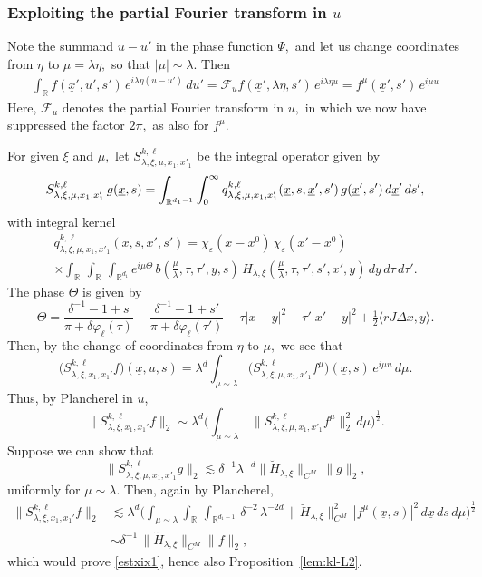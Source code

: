 \documentclass[leqno]{amsart}
\theoremstyle{definition}
\theoremstyle{remark}
\numberwithin{equation}{section}
\newcommand{\R}{\mathbb{R}}
\newcommand{\scriptF}{\mathcal{F}}
\newcommand\la{{\lambda}}
\begin{document}
\subsubsection{Exploiting the partial Fourier transform in $u$}

Note the summand $u-u'$ in the phase function $\Psi,$ and let us change coordinates from $\eta$  to $\mu = \lambda\eta,$ so that $|\mu|\sim\la$. Then 
\begin{align*}
\int_{\R}f(\underline x',u',s') \, e^{i \lambda \eta(u-u')} \, d u' 
 = \scriptF_u f(\underline x', \lambda \eta,s') \, e^{i \lambda \eta u} 
 = f^{\mu}(\underline x',s') \, e^{i \mu u}
\end{align*}
Here,  $\scriptF_u $ denotes the partial Fourier transform in $u,$ in which we now have suppressed the factor $2\pi,$ as also for $f^\mu$.

For given $\xi$ and $\mu,$ let $S_{\lambda,\xi,\mu,x_1,x'_1}^{k,\ell}$ be the integral operator given by
\[
S_{\lambda,\xi,\mu,x_1,x'_1}^{k,\ell} \, g(\underline x,s) \\
 = \int_{\R^{d_1-1}} \int_0^\infty q^{k,\ell}_{\lambda,\xi,\mu,x_1,x'_1}(\underline x,s,\underline x',s') \, g(\underline x',s') \, d\underline x' \, ds',
\]
with integral kernel
\begin{multline*}
q^{k,\ell}_{\lambda,\xi,\mu,x_1,x'_1}
(\underline x,s,\underline x',s')
=
\chi_\varepsilon(x-x^0)\,
\chi_\varepsilon(x'-x^0)\\
\times \int_\R\,\int_\R\,\int_{\R^{d_1}}
e^{i\mu\Theta}\,
b(\tfrac\mu\la,\tau,\tau',y,s)\,
H_{\la,\xi}
(\tfrac\mu\la,\tau,\tau',s',x',y)\,
dy\,d\tau\,d\tau'.
\end{multline*}
 The phase $\Theta$ is given by
\[
\Theta
 = \frac{\delta^{-1}-1 + s}{\pi + \delta \varphi_\ell(\tau)} - \frac{\delta^{-1}-1 + s'}{\pi + \delta \varphi_\ell(\tau')} - \tau| x-y|^2 + \tau'| x'-y|^2 + \tfrac12 \langle rJ\Delta x,y\rangle.
\]
Then, by the change of coordinates from $\eta$ to $\mu,$ we see that  
\[
\big(S_{\lambda,\xi,x_1,x_1'}^{k,\ell}f\big)(\underline x,u,s)=\lambda^{d} \int_{\mu\sim \la} \big(S_{\lambda,\xi,\mu,x_1,x'_1}^{k,\ell} f^{\mu}\big)(\underline x,s) \, e^{i \mu u} \, d\mu. 
\]
Thus, by Plancherel in $u$, 
\[
\big\| S_{\lambda,\xi,x_1,x_1'}^{k,\ell} f \big\|_2 
\sim \lambda^d \Big( \int_{\mu\sim \la}  \, \big\| S_{\lambda,\xi,\mu,x_1,x'_1}^{k,\ell} f^{\mu}\big\|_2^2 \, d\mu\Big)^{\frac 1 2}.
\]
Suppose we can show that
\begin{equation}\label{Smuest}
\|S_{\lambda,\xi,\mu,x_1,x'_1}^{k,\ell} g \|_2 \lesssim \delta^{-1} \lambda^{-d} \|\breve H_{\la,\xi}\|_{C^M}\,\|g\|_2,
\end{equation}
uniformly for $\mu\sim \lambda$.
Then, again by Plancherel, 
\begin{align*}
\big\| S_{\lambda,\xi,x_1,x_1'}^{k,\ell} f \big\|_2 
& \lesssim \lambda^d \Big( \int_{\mu\sim \la}  \int_\R \, \int_{\R^{d_1-1}} \, \delta^{-2} \, \lambda^{-2d} \, \|\breve H_{\la,\xi}\|_{C^M}^2\, |f^{\mu}(\underline x,s)|^2 \, d \underline x \, d s \, d\mu \Big)^{\frac 1 2}\\
& \sim \delta^{-1} \, \|\breve H_{\la,\xi}\|_{C^M}\|f\|_2,
\end{align*} which would prove  \eqref{estxix1}, hence also Proposition~\ref{lem:kl-L2}.
\end{document}

